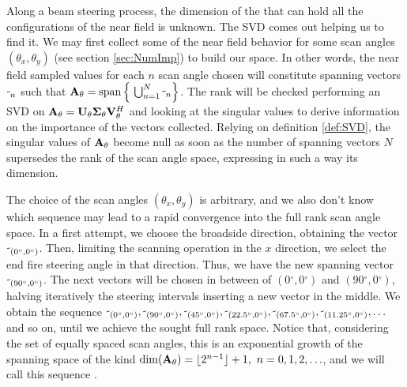 \par Along a beam steering process, the dimension of the  that can hold all the configurations of the near field is  unknown. The SVD comes out helping us to find it. We may first collect some  of the near field behavior for some scan angles $(\theta_x,\theta_y)$ (see section \ref{sec:NumImp}) to build our space. In other words, the near field sampled values for each $n$ scan angle chosen will constitute spanning vectors $\vect{\psi}_n$ such that $\mat{A}_\theta = \spanning{ {\ \bigcup_{n=1}^{N} \vect{\psi}_n}}$. The rank will be checked performing an SVD on $\mathbf{A}_\theta = \mathbf{U}_\theta \mathbf{\Sigma}_\theta \mathbf{V}^H_\theta $ and looking at the singular values to derive information on the importance of the vectors collected. Relying on definition \ref{def:SVD}, the singular values of $\mathbf{A}_\theta$ become null as soon as the number of spanning vectors $N$ supersedes the rank of the scan angle space, expressing in such a way its dimension.

\par The choice of the scan angles $(\theta_x,\theta_y)$ is arbitrary, and we also don't know  which sequence may lead to a rapid convergence into the full rank scan angle space. In a first attempt, we choose the broadside direction, obtaining the vector $\mathbf{\psi}_{(0^\circ,0^\circ)}$. Then, limiting the scanning operation in the $x$ direction, we select the end fire steering angle in that direction. Thus, we have the new spanning vector $\mathbf{\psi}_{(90^\circ,0^\circ)}$. The next vectors will be chosen in between of $(0\ensuremath{^\circ},0\ensuremath{^\circ})$ and $(90\ensuremath{^\circ},0\ensuremath{^\circ})$, halving iteratively the steering intervals inserting a new vector in the middle. We obtain the sequence $\mathbf{\psi}_{(0^\circ,0^\circ)}, \mathbf{\psi}_{(90^\circ,0^\circ)}, \mathbf{\psi}_{(45^\circ,0^\circ)}, \mathbf{\psi}_{(22.5^\circ,0^\circ)}, \mathbf{\psi}_{(67.5^\circ,0^\circ)}, \mathbf{\psi}_{(11.25^\circ,0^\circ)}, \dots$ and so on, until we achieve the sought full rank space. Notice that, considering the set of equally spaced scan angles, this is an exponential growth of the spanning space of the kind $ \mathrm{dim}(\mathbf{A}_\theta) = \lfloor 2^{n-1} \rfloor + 1, \ n = 0,1,2,\ldots$, and we will call this sequence .

